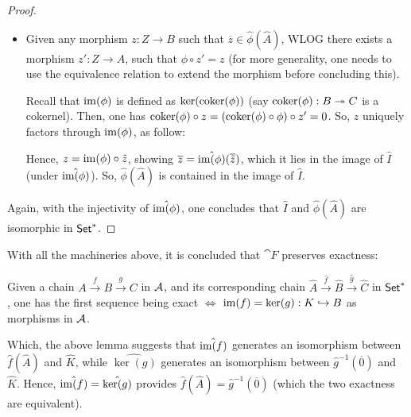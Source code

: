 \documentclass{article}
\begin{document}
\begin{proof}
\begin{itemize}
        \item[$\supseteq$:] Given any morphism $z:Z\rightarrow B$ such that $\overline{z}\in\hat{\phi}(\hat{A})$, WLOG there exists a morphism $z':Z\rightarrow A$, such that $\phi\circ z' = z$ (for more generality, one needs to use the equivalence relation to extend the morphism before concluding this).
        
        Recall that $\mathrm{im}(\phi)$ is defined as $\ker(\mathrm{coker}(\phi))$ (say $\mathrm{coker}(\phi):B\twoheadrightarrow C$ is a cokernel). Then, one has $\mathrm{coker}(\phi)\circ z = (\mathrm{coker}(\phi)\circ \phi)\circ z' = 0$. So, $z$ uniquely factors through $\mathrm{im}(\phi)$, as follow:
        \begin{center}
        \end{center}
        Hence, $z = \mathrm{im}(\phi)\circ \tilde{z}$, showing $\overline{z} = \hat{\mathrm{im}(\phi)}(\overline{\tilde{z}})$, which it lies in the image of $\hat{I}$ (under $\hat{\mathrm{im}(\phi)}$). So, $\hat{\phi}(\hat{A})$ is contained in the image of $\hat{I}$.
    \end{itemize}
    Again, with the injectivity of $\hat{\mathrm{im}(\phi)}$, one concludes that $\hat{I}$ and $\hat{\phi}(\hat{A})$ are isomorphic in $\mathsf{Set}^*$.
\end{proof}

\hfil

With all the machineries above, it is concluded that $\cat{F}$ preserves exactness: 

Given a chain $A\xrightarrow{f} B\xrightarrow{g} C$ in $\cal{A}$, and its corresponding chain $\hat{A}\xrightarrow{\hat{f}}\hat{B}\xrightarrow{\hat{g}}\hat{C}$ in $\mathsf{Set}^*$, one has the first sequence being exact $\iff$ $\mathrm{im}(f)=\ker(g):K\hookrightarrow B$ as morphisms in $\cal{A}$.

Which, the above lemma suggests that $\hat{\mathrm{im}(f)}$ generates an isomorphism between $\hat{f}(\hat{A})$ and $\hat{K}$, while $\hat{\ker(g)}$ generates an isomorphism between $\hat{g}^{-1}(\overline{0})$ and $\hat{K}$. Hence, $\hat{\mathrm{im}(f)}=\hat{\ker(g)}$ provides $\hat{f}(\hat{A})=\hat{g}^{-1}(\overline{0})$ (which the two exactness are equivalent).
\end{document}
